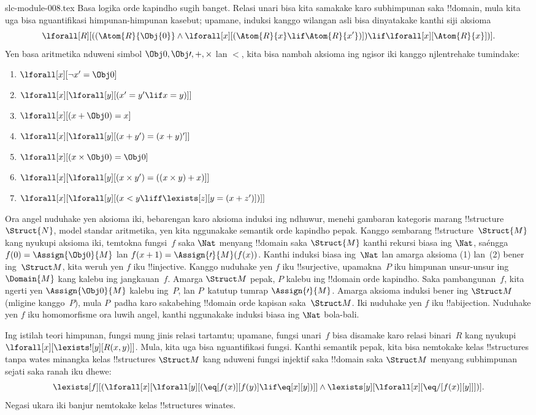 \begin{filecontents*}[overwrite]{slc-module-008.tex}
Basa logika orde kapindho
sugih banget. Relasi unari
bisa kita samakake karo
subhimpunan saka !!{domain},
mula kita uga bisa
nguantifikasi himpunan-himpunan
kasebut; upamane, induksi
kanggo wilangan asli bisa
dinyatakake kanthi siji aksioma
\[
\lforall[R][((\Atom{R}{\Obj{0}} \land \lforall[x][(\Atom{R}{x} \lif
    \Atom{R}{x'})]) \lif \lforall[x][\Atom{R}{x}])].
\]
Yen basa aritmetika nduweni
simbol $\Obj 0, \Obj \prime, +,
\times$ lan $<$, kita bisa
nambah aksioma ing ngisor iki
kanggo njlentrehake tumindake:
\begin{enumerate}
\item $\lforall[x][\lnot x' = \Obj 0]$
\item $\lforall[x][\lforall[y][(x' = y' \lif x = y)]]$
\item $\lforall[x][(x + \Obj 0) = x]$
\item $\lforall[x][\lforall[y][(x + y') = (x + y)']]$
\item $\lforall[x][(x \times \Obj 0) = \Obj 0]$
\item $\lforall[x][\lforall[y][(x \times y') = ((x \times y) + x)]]$
\item $\lforall[x][\lforall[y][(x < y \liff \lexists[z][y = (x + z')])]]$
\end{enumerate}
Ora angel nuduhake yen aksioma
iki, bebarengan karo aksioma
induksi ing ndhuwur, menehi
gambaran kategoris marang
!!{structure}~$\Struct{N}$,
model standar aritmetika,
yen kita nggunakake semantik
orde kapindho pepak.
Kanggo sembarang
!!{structure}~$\Struct{M}$
kang nyukupi aksioma iki,
temtokna fungsi~$f$
saka $\Nat$ menyang
!!{domain} saka $\Struct{M}$
kanthi rekursi biasa ing $\Nat$,
saéngga $f(0) = \Assign{\Obj 0}{M}$
lan $f(x+1) = \Assign{\prime}{M}(f(x))$.
Kanthi induksi biasa
ing~$\Nat$ lan amarga aksioma
(1) lan~(2) bener ing~$\Struct M$,
kita weruh yen $f$ iku
!!{injective}. Kanggo nuduhake
yen $f$ iku !!{surjective},
upamakna~$P$ iku himpunan
unsur-unsur ing~$\Domain{M}$
kang kalebu ing jangkauan~$f$.
Amarga $\Struct M$ pepak,
$P$ kalebu ing !!{domain}
orde kapindho. Saka pambangunan~$f$,
kita ngerti yen $\Assign{\Obj
  0}{M}$ kalebu ing~$P$,
lan $P$~katutup tumrap
$\Assign{\prime}{M}$.
Amarga aksioma induksi bener
ing $\Struct M$ (mligine
kanggo~$P$), mula $P$~padha
karo sakabehing !!{domain}
orde kapisan saka~$\Struct M$.
Iki nuduhake yen $f$
iku !!a{bijection}.
Nuduhake yen $f$ iku
homomorfisme ora luwih angel,
kanthi nggunakake induksi
biasa ing $\Nat$ bola-bali.

Ing istilah teori himpunan,
fungsi mung jinis relasi
tartamtu; upamane, fungsi
unari~$f$ bisa disamake
karo relasi binari~$R$
kang nyukupi
$\lforall[x][\lexists![y][R(x,y)]]$.
Mula, kita uga bisa
nguantifikasi fungsi.
Kanthi semantik pepak,
kita bisa nemtokake kelas
!!{structure}s tanpa wates
minangka kelas
!!{structure}s $\Struct M$
kang nduweni fungsi injektif
saka !!{domain} saka $\Struct M$
menyang subhimpunan sejati
saka ranah iku dhewe:
\[
\lexists[f][(\lforall[x][\lforall[y][(\eq[f(x)][f(y)] \lif \eq[x][y])]]
  \land \lexists[y][\lforall[x][\eq/[f(x)][y]]])].
\]
Negasi ukara iki banjur
nemtokake kelas
!!{structure}s winates.


\end{filecontents*}
